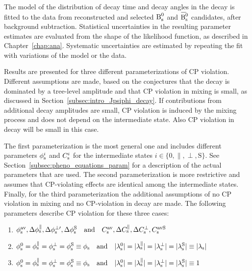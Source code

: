 The model of the distribution of decay time and decay angles in the \BstoJpsiKK{} decay is fitted to the data from reconstructed and
selected $\Bs$ and $\Bsbar$ candidates, after background subtraction. Statistical uncertainties in the resulting parameter estimates are
evaluated from the shape of the likelihood function, as described in Chapter~\ref{chap:ana}. Systematic uncertainties are estimated by
repeating the fit with variations of the model or the data.

Results are presented for three different parameterizations of CP violation. Different assumptions are made, based on the conjectures that
the \BstoJpsiKK{} decay is dominated by a tree-level amplitude and that CP violation in mixing is small, as discussed in
Section~\ref{subsec:intro_Jpsiphi_decay}. If contributions from additional decay amplitudes are small, CP violation is induced by the
\BsBsbar{} mixing process and does not depend on the intermediate state. Also CP violation in decay will be small in this case.

The first parameterization is the most general one and includes different parameters $\phisi$ and $\Csi$ for the intermediate states
$i\in\{\text{0}, \parallel, \perp, \text{S}\}$. See Section~\ref{subsec:pheno_equations_param} for a description of the actual parameters
that are used. The second parameterization is more restrictive and assumes that CP-violating effects are identical among the intermediate
states. Finally, for the third parameterization the additional assumptions of no CP violation in mixing and no CP-violation in decay are
made. The following parameters describe CP violation for these three cases:
\begin{enumerate}
  \item $\phisav,\Delphispara,\Delphisperpp,\DelphisS
         \quad\text{and}\quad\Csav,\DelCspara,\DelCsperp,\CsavS$
  \item $\phisi[\text{0}]=\phisi[\parallel]=\phisi[\perp]=\phisi[\text{S}]\equiv\phis
         \quad\text{and}\quad\lamsiAbs[\text{0}]=\lamsiAbs[\parallel]=\lamsiAbs[\perp]=\lamsiAbs[\text{S}]\equiv\lamsAbs$
  \item $\phisi[\text{0}]=\phisi[\parallel]=\phisi[\perp]=\phisi[\text{S}]\equiv\phis
         \quad\text{and}\quad\lamsiAbs[\text{0}]=\lamsiAbs[\parallel]=\lamsiAbs[\perp]=\lamsiAbs[\text{S}]\equiv1$
\end{enumerate}

